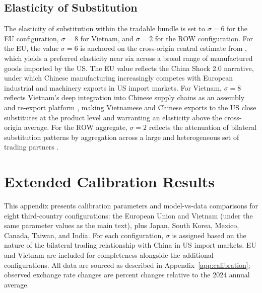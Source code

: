 \documentclass[11pt]{article}
\theoremstyle{plain}
\theoremstyle{remark}
\numberwithin{lemma}{section}
\numberwithin{proposition}{section}
\numberwithin{corollary}{section}
\newcommand{\rev}[1]{{\color{RevBlue}#1}}
\begin{document}
\begin{appendix}
\subsection*{Elasticity of Substitution}
The elasticity of substitution within the tradable bundle is set to $\sigma = 6$ for the EU configuration, $\sigma = 8$ for Vietnam, and $\sigma = 2$ for the ROW configuration. For the EU, the value $\sigma = 6$ is anchored on the cross-origin central estimate from \citet{amiti2019impact}, which yields a preferred elasticity near six across a broad range of manufactured goods imported by the US. The EU value reflects the China Shock 2.0 narrative, under which Chinese manufacturing increasingly competes with European industrial and machinery exports in US import markets. For Vietnam, $\sigma = 8$ reflects Vietnam's deep integration into Chinese supply chains as an assembly and re-export platform \citep{fajgelbaum2024trade}, making Vietnamese and Chinese exports to the US close substitutes at the product level and warranting an elasticity above the cross-origin average. For the ROW aggregate, $\sigma = 2$ reflects the attenuation of bilateral substitution patterns by aggregation across a large and heterogeneous set of trading partners \citep{fajgelbaum2020return, feenstra2018}.

\section{Extended Calibration Results}
\label{app:extended_calibrations}

This appendix presents calibration parameters and model-vs-data comparisons for eight third-country configurations: the European Union and Vietnam \rev{(under the same parameter values as the main text)}, plus Japan, South Korea, Mexico, Canada, Taiwan, and India. For each configuration, $\sigma$ is assigned based on the nature of the bilateral trading relationship with China in US import markets. EU and Vietnam are included for completeness alongside the additional configurations. All data are sourced as described in Appendix~\ref{app:calibration}; observed exchange rate changes are percent changes relative to the 2024 annual average.


\end{appendix}
\end{document}
